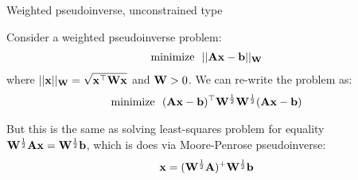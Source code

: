 \documentclass{beamer}
\begin{document}
\begin{frame}{Weighted pseudoinverse, unconstrained type}
	\begin{flushleft}
		
		Consider a weighted pseudoinverse problem:
		\begin{align}
			\text{minimize} \ \ ||\mathbf{A}\mathbf{x}-\mathbf{b}||_{\mathbf{W}}
		\end{align}		
		where $||\mathbf{x}||_{\mathbf{W}} = \sqrt{\mathbf{x}^\top\mathbf{W}\mathbf{x}}$ and $\mathbf{W} > 0$. We can re-write the problem as:
		\begin{align}
			\text{minimize} \ \ (\bo{A}\bo{x}-\bo{b})\T\bo{W}^\frac{1}{2}\bo{W}^\frac{1}{2}(\bo{A}\bo{x}-\bo{b})
		\end{align}
		
		But this is the same as solving least-squares problem for equality $\mathbf{W}^\frac{1}{2}\mathbf{A}\mathbf{x}=\mathbf{W}^\frac{1}{2}\mathbf{b}$, which is does via Moore-Penrose pseudoinverse:
		\begin{align}
			\mathbf{x}=(\mathbf{W}^\frac{1}{2}\mathbf{A})^+\mathbf{W}^\frac{1}{2}\mathbf{b}
		\end{align}
		
	\end{flushleft}
\end{frame}
\end{document}
